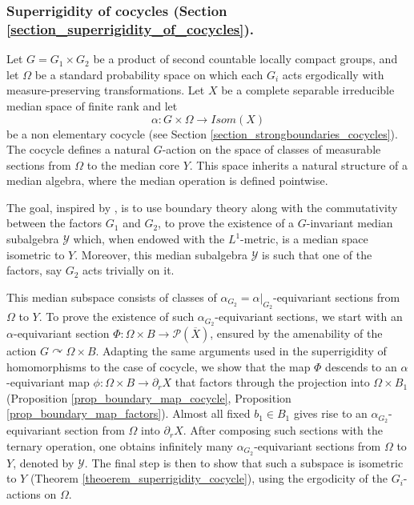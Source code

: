 \documentclass{amsart}
\numberwithin{equation}{section}
\newcommand{\YY}{\mathcal{Y}}     %
\newcommand{\PP}{\mathcal{P}}     %
\theoremstyle{definition}
\def\bar{\overline}
\begin{document}
 
 \subsubsection{Superrigidity of cocycles (Section \ref{section_superrigidity_of_cocycles}).}

 
 

 Let $G=G_1\times G_2$ be a product of second countable locally compact groups, and let $\Omega$ be a standard probability space on which each $G_i$ acts ergodically with measure-preserving transformations. Let $X$ be a complete separable irreducible median space of finite rank and let $$\alpha:G\times \Omega \rightarrow Isom(X) $$ be a non elementary cocycle (see Section \ref{section_strongboundaries_cocycles}). The cocycle defines a natural $G$-action on the space of classes of measurable sections from $\Omega$ to the median core $Y$. This space inherits a natural structure of a median algebra, where the median operation is defined pointwise.\par  
 The goal, inspired by \cite{bader2006superrigidity}, is to use boundary theory along with the commutativity between the factors $G_1$ and $G_2$, to prove the existence of a $G$-invariant median subalgebra $\mathcal{Y}$ which, when endowed with the $L^1$-metric, is a median space isometric to $Y$. Moreover, this median subalgebra $\YY$ is such that one of the factors, say $G_2$ acts trivially on it. \par 
 This median subspace consists of classes of $\alpha_{G_2}=\alpha|_{G_2}$-equivariant sections from $\Omega$ to $Y$. To prove the existence of such $\alpha_{G_2}$-equivariant sections, we start with an $\alpha$-equivariant section $\Phi:\Omega\times B\rightarrow \PP(\bar X)$, ensured by the amenability of the action $G\curvearrowright \Omega\times B$. Adapting the same arguments used in the superrigidity of homomorphisms to the case of cocycle, we show that the map $\Phi$ descends to an $\alpha$-equivariant map $\phi:\Omega\times B\rightarrow \partial_r X$ that factors through the projection into $\Omega\times B_1$ (Proposition \ref{prop_boundary_map_cocycle}, Proposition \ref{prop_boundary_map_factors}). Almost all fixed $b_1\in B_1$ gives rise to an $\alpha_{G_2}$-equivariant section from $\Omega$ into $\partial_r X$. After composing such sections with the ternary operation, one obtains infinitely many $\alpha_{G_2}$-equivariant sections from $\Omega$ to $Y$, denoted by $\YY$. The final step is then to show that such a 
 subspace is isometric to $Y$ (Theorem \ref{theoerem_superrigidity_cocycle}), using the ergodicity of the $G_i$-actions on $\Omega$.
\end{document}
